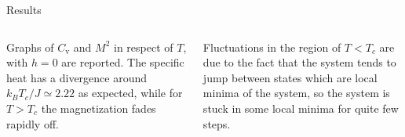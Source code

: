 \documentclass{beamer}
\begin{document}
\begin{frame}{Results}

\begin{columns}


Graphs of $C_{\text{v}}$ and $M^2$ in respect of $T$, with $h=0$ are reported. The specific
heat has a divergence around $k_B T_c / J \simeq 2.22$ as expected, while for 
$T > T_c$ the magnetization fades rapidly off.

\vspace{5mm}

Fluctuations in the region of $T < T_c$ are due to the fact that the system tends
to jump between states which are local minima of the system, so the system is
stuck in some local minima for quite few steps. 



\end{columns}
\end{frame}
\end{document}
